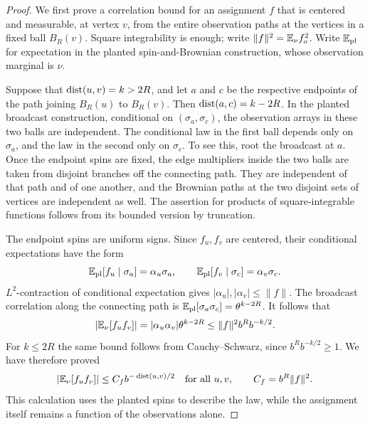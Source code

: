 \begin{proof}
We first prove a correlation bound for an assignment \(f\) that is
centered and measurable, at vertex \(v\), from the entire observation
paths at the vertices in a fixed ball \(B_R(v)\).  Square
integrability is enough; write \(\|f\|^2=\mathbb E_\nu f_o^2\).
Write \(\mathbb E_{\mathrm{pl}}\) for expectation in the planted
spin-and-Brownian construction, whose observation marginal is \(\nu\).

Suppose that \(\operatorname{dist}(u,v)=k>2R\), and let \(a\) and \(c\) be the
respective endpoints of the path joining \(B_R(u)\) to \(B_R(v)\).
Then \(\operatorname{dist}(a,c)=k-2R\).  In the planted broadcast construction,
conditional on \((\sigma_a,\sigma_c)\), the observation arrays in
these two balls are independent.  The conditional law in the first
ball depends only on \(\sigma_a\), and the law in the second only on
\(\sigma_c\).  To see this, root the broadcast at \(a\).  Once the
endpoint spins are fixed, the edge multipliers inside the two balls
are taken from disjoint branches off the connecting path.  They are
independent of that path and of one another, and the Brownian paths
at the two disjoint sets of vertices are independent as well.
The assertion for products of square-integrable functions follows
from its bounded version by truncation.

The endpoint spins are uniform signs.  Since \(f_u,f_v\) are
centered, their conditional expectations have the form
\[
 \mathbb E_{\mathrm{pl}}[f_u\mid\sigma_a]=\alpha_u\sigma_a,\qquad
 \mathbb E_{\mathrm{pl}}[f_v\mid\sigma_c]=\alpha_v\sigma_c.
\]
\(L^2\)-contraction of conditional expectation gives
\(|\alpha_u|,|\alpha_v|\le\|f\|\).  The broadcast correlation along
the connecting path is
\(\mathbb E_{\mathrm{pl}}[\sigma_a\sigma_c]=\theta^{k-2R}\).
It follows that
\[
 |\mathbb E_\nu[f_uf_v]|
   =|\alpha_u\alpha_v|\theta^{k-2R}
   \le\|f\|^2 b^R b^{-k/2}.
\]
For \(k\le2R\) the same bound follows from Cauchy--Schwarz, since
\(b^R b^{-k/2}\ge1\).  We have therefore proved
\begin{equation}
\label{eq:local-correlation}
 |\mathbb E_\nu[f_uf_v]|
 \le C_f b^{-\operatorname{dist}(u,v)/2}
 \quad\text{for all \(u,v\)},\qquad C_f=b^R\|f\|^2.
\end{equation}
This calculation uses the planted spins to describe the law, while
the assignment itself remains a function of the observations alone.


\end{proof}
